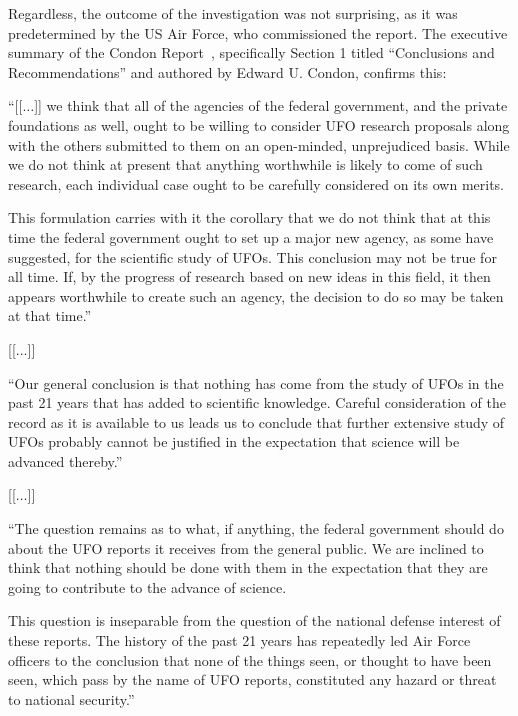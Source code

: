 Regardless, the outcome of the investigation was not surprising, as it was predetermined by the US Air Force, who commissioned the report. The executive summary of the Condon Report~\cite{Condon-report1,Condon-report2,Condon-report3,Condon-report,Condon-report-Bantam,Condon-report-Dutton}, specifically Section 1 titled ``Conclusions and Recommendations'' and authored by Edward U. Condon, confirms this:
\begin{svgraybox}
``[[$\ldots$]] we think that all of the agencies of the federal government, and the private foundations as well,
ought to be willing to consider UFO research proposals along with the others submitted to them on an open-minded, unprejudiced basis.
 While we do not think at present that anything worthwhile is likely to come of such research, each individual case ought
to be carefully considered on its own merits.

This formulation carries with it the corollary that we do not think that at this time the federal government ought
to set up a major new agency, as some have suggested, for the scientific study of UFOs.
This conclusion may not be true for all time. If, by the progress of research based on new ideas in this field,
it then appears worthwhile to create such an agency, the decision to do so may be taken at that time.''

[[$\ldots$]]

``Our general conclusion is that nothing has come from the study of UFOs in the past 21 years that has added to scientific knowledge.
Careful consideration of the record as it is available to us leads us to conclude that further extensive study of
UFOs probably cannot be justified in the expectation that science will be advanced thereby.''

[[$\ldots$]]

``The question remains as to what, if anything, the federal government should do about the UFO reports it receives from the general public.
We are inclined to think that nothing should be done with them in the expectation that they are going to contribute to the advance of science.

This question is inseparable from the question of the national defense interest of these reports.
The history of the past 21 years has repeatedly led Air Force officers to the conclusion that none of the things seen,
or thought to have been seen, which pass by the name of UFO reports, constituted any hazard or threat to national security.''




\end{svgraybox}
